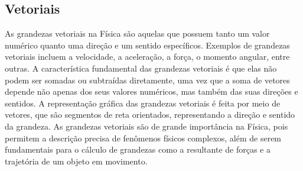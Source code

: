\subsection{Vetoriais}
As grandezas vetoriais na Física são aquelas que possuem tanto um valor numérico quanto uma direção e um sentido específicos. Exemplos de grandezas vetoriais incluem a velocidade, a aceleração, a força, o momento angular, entre outras. A característica fundamental das grandezas vetoriais é que elas não podem ser somadas ou subtraídas diretamente, uma vez que a soma de vetores depende não apenas dos seus valores numéricos, mas também das suas direções e sentidos. A representação gráfica das grandezas vetoriais é feita por meio de vetores, que são segmentos de reta orientados, representando a direção e sentido da grandeza. As grandezas vetoriais são de grande importância na Física, pois permitem a descrição precisa de fenômenos físicos complexos, além de serem fundamentais para o cálculo de grandezas como a resultante de forças e a trajetória de um objeto em movimento.
